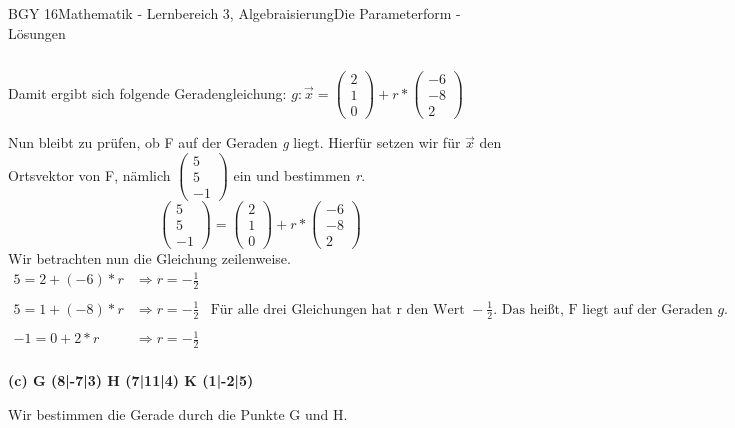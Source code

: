 \documentclass[oneside,openany,headings=optiontotoc,11pt,numbers=noenddot]{scrreprt}
\begin{document}
\begin{worksheet}{BGY 16}{Mathematik - Lernbereich 3, Algebraisierung}{Die Parameterform - Lösungen}
\begin{framed}
\begin{tabularx}{\textwidth}{XX}
			\end{tabularx}
			Damit ergibt sich folgende Geradengleichung: \(g: \vec{x} = \left(\begin{array}{c}2 \\ 1 \\ 0\end{array}\right) + r*\left(\begin{array}{c}-6\\-8\\2\end{array}\right)\)\\
			\par\noindent
			Nun bleibt zu prüfen, ob F auf der Geraden \textit{g} liegt. Hierfür setzen wir für \(\vec{x}\)	den Ortsvektor von F, nämlich \(\left(\begin{array}{c}5\\5\\-1\end{array}\right)\) ein und bestimmen \textit{r}.\\
			\[\left(\begin{array}{c}5\\5\\-1\end{array}\right) = \left(\begin{array}{c}2\\1\\0\end{array}\right) + r*\left(\begin{array}{c}-6\\-8\\2\end{array}\right)\]
			Wir betrachten nun die Gleichung zeilenweise.
			\[\begin{array}{llc}
			5 = 2 + (-6)*r& \Rightarrow r = -\frac{1}{2}&\\
			&&\\
			5 = 1 + (-8)*r & \Rightarrow r = -\frac{1}{2}&\text{Für alle drei Gleichungen hat r den Wert } -\frac{1}{2}\text{. Das heißt, F liegt auf der Geraden } g.\\
			&&\\
			-1 = 0 + 2*r & \Rightarrow r = -\frac{1}{2} &\\
			\end{array}\]
			\par
			\textbf{(c) G (8|-7|3) H (7|11|4) K (1|-2|5)}\\
			\par\noindent
			Wir bestimmen die Gerade durch die Punkte G und H.\\

\end{framed}
\end{worksheet}
\end{document}
